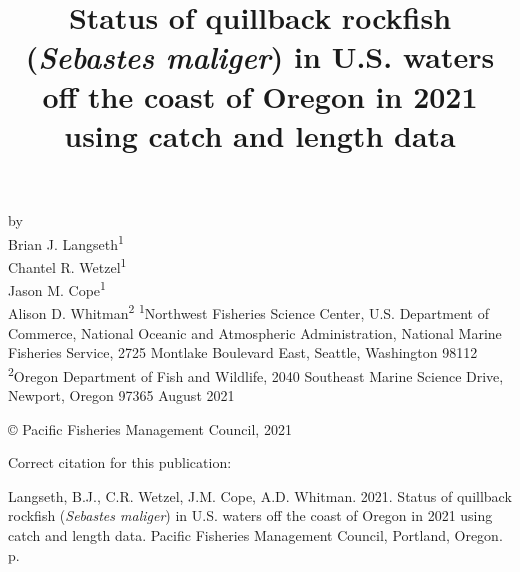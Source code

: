 \documentclass[11pt,
  english,
  a4paper,
]{article}
\date{}
\newcommand{\trTitle}{Status of quillback rockfish (\emph{Sebastes maliger}) in U.S. waters off the coast of Oregon in 2021 using catch and length data}
\newcommand{\trYear}{2021}
\newcommand{\trMonth}{August}
\newcommand{\trAuthsBack}{Langseth, B.J., C.R. Wetzel, J.M. Cope, A.D. Whitman}
\newcommand{\trCitation}{
\begin{hangparas}{1em}{1}
\trAuthsBack{}. \trYear{}. \trTitle{}. Pacific Fisheries Management Council, Portland, Oregon. \pageref{LastPage}{}\,p.
\end{hangparas}}
\begin{document}

\renewcommand*{\thefootnote}{\fnsymbol{footnote}}

\small
\thispagestyle{empty}
\noindent
\begin{center}
\title{Status of quillback rockfish (\emph{Sebastes maliger}) in U.S. waters off the coast of Oregon in 2021 using catch and length data}
\vspace{1.5cm}
{\Large\textbf{}}
\vfill
by\\
Brian J. Langseth\textsuperscript{1}\\
Chantel R. Wetzel\textsuperscript{1}\\
Jason M. Cope\textsuperscript{1}\\
Alison D. Whitman\textsuperscript{2}\vfill
\textsuperscript{1}Northwest Fisheries Science Center, U.S. Department of Commerce, National Oceanic and Atmospheric Administration, National Marine Fisheries Service, 2725 Montlake Boulevard East, Seattle, Washington 98112\\
\textsuperscript{2}Oregon Department of Fish and Wildlife, 2040 Southeast Marine Science Drive, Newport, Oregon 97365\vfill
\trMonth{} \trYear{}
\end{center}
\clearpage

\thispagestyle{empty}
\vspace*{\fill}
\begin{center}
\copyright{} Pacific Fisheries Management Council, \trYear{}\\
\end{center}
\par
\bigskip
\noindent
Correct citation for this publication:
\bigskip
\par
\trCitation{}
\clearpage


\tableofcontents\clearpage
\label{TRlastRoman}
\clearpage

\newpage
\thispagestyle{empty} %

\pagestyle{plain}  %
\renewcommand*{\thefootnote}{\arabic{footnote}}  %
\setcounter{footnote}{0}  %
\renewcommand{\headrulewidth}{0.5pt}
\renewcommand{\footrulewidth}{0.5pt}
\end{document}
